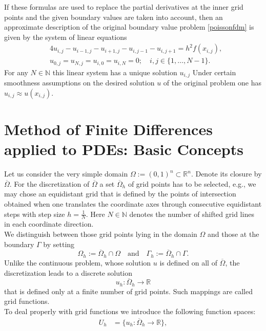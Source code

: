 \documentclass[%
    corpo=11pt,
    twoside,
    stile=classica,
    oldstyle,
    autoretitolo,
    tipotesi=magistrale,
    greek,
    evenboxes,
    english
]{toptesi}
\begin{document}
\begin{appendices}
If these formulas are used to replace the partial derivatives at the inner grid points and the given boundary values are taken into account, then an approximate description of the original boundary value problem \eqref{poissonfdm} is given by the
system of linear equations
\begin{align}
&4u_{i,j} - u_{i-1,j} -u_{i+1,j} -u_{i,j-1} -u_{i,j+1} = h^2f(x_{i,j}), \nonumber \\
&u_{0,j} = u_{N,j} = u_{i,0} = u_{i,N} = 0; \quad i,j \in \{1,\dots,N-1\}.
\end{align}
For any $N\in \mathbb{N}$ this linear system has a unique solution $u_{i,j}$ Under certain smoothness assumptions on the desired solution $u$ of the original problem one has $u_{i,j} \approx u(x_{i,j})$.

\section{Method of Finite Differences applied to PDEs: Basic Concepts}
Let us consider the very simple domain $\Omega := (0,1)^n \subset \mathbb{R}^n$. Denote its closure by $\overline{\Omega}$. For the discretization of $\overline{\Omega}$ a set $\overline{\Omega}_h$ of grid points has to be
selected, e.g., we may chose an equidistant grid that is defined by the points
of intersection obtained when one translates the coordinate axes through consecutive equidistant steps with step size $h=\frac{1}{N}$. Here $N\in \mathbb{N}$ denotes the number of shifted grid lines in each coordinate direction. \\
We distinguish between those grid points lying in the domain $\Omega$ and those at the boundary $\Gamma$ by setting
\begin{equation}
\Omega_h := \overline{\Omega}_h \cap \Omega \quad \text{and} \quad \Gamma_h := \overline{\Omega}_h \cap \Gamma.
\end{equation}
Unlike the continuous problem, whose solution $u$ is defined on all of $\overline{\Omega}$, the discretization leads to a discrete solution
\begin{equation}
u_h: \overline{\Omega}_h \longrightarrow \mathbb{R}
\end{equation}
that is defined only at a finite number of grid points. Such mappings are called grid functions. \\
To deal properly with grid functions we introduce the following function spaces:
\begin{align}
U_h &= \{u_h:\overline{\Omega}_h \longrightarrow \mathbb{R} \}, \\

\end{align}
\end{appendices}
\end{document}
